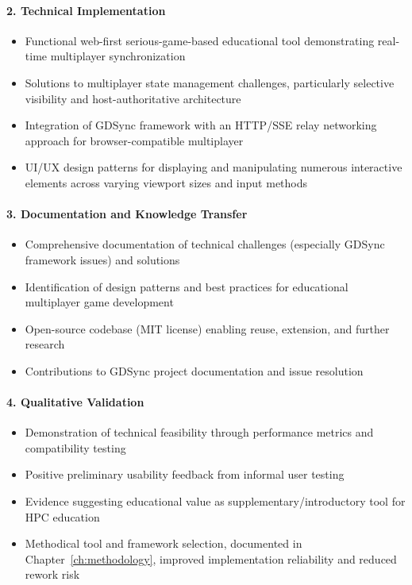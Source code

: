 \paragraph*{2. Technical Implementation}

\begin{itemize}
    \item Functional web-first serious-game-based educational tool demonstrating real-time multiplayer synchronization
    \item Solutions to multiplayer state management challenges, particularly selective visibility and host-authoritative architecture
    \item Integration of GDSync framework with an HTTP/SSE relay networking approach for browser-compatible multiplayer
    \item UI/UX design patterns for displaying and manipulating numerous interactive elements across varying viewport sizes and input methods
\end{itemize}

\paragraph*{3. Documentation and Knowledge Transfer}

\begin{itemize}
    \item Comprehensive documentation of technical challenges (especially GDSync framework issues) and solutions
    \item Identification of design patterns and best practices for educational multiplayer game development
    \item Open-source codebase (MIT license) enabling reuse, extension, and further research
    \item Contributions to GDSync project documentation and issue resolution
\end{itemize}

\paragraph*{4. Qualitative Validation}

\begin{itemize}
    \item Demonstration of technical feasibility through performance metrics and compatibility testing
    \item Positive preliminary usability feedback from informal user testing
    \item Evidence suggesting educational value as supplementary/introductory tool for HPC education
    \item Methodical tool and framework selection, documented in Chapter~\ref{ch:methodology}, improved implementation reliability and reduced rework risk
\end{itemize}

